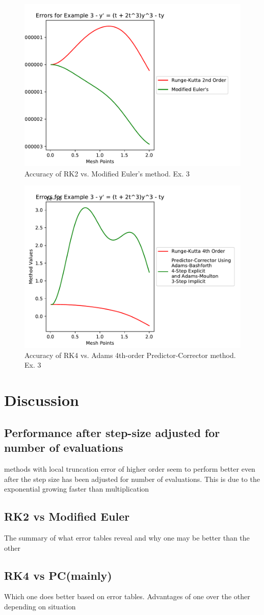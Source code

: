 \documentclass[11pt]{article}	%
\begin{document}
\begin{figure}[H]
\centering
\includegraphics[width=.45\textwidth]{rk2_meuler_3}
\caption{Accuracy of RK2 vs. Modified Euler's method. Ex. 3}
\label{fig:rk2_meuler_3}
\end{figure}

\begin{figure}[H]
\centering
\includegraphics[width=.45\textwidth]{rk4_predictor_3}
\caption{Accuracy of RK4 vs. Adams 4th-order Predictor-Corrector method. Ex. 3}
\label{fig:rk4_predictor_3}
\end{figure}
\clearpage
\section{Discussion}

\subsection{Performance after step-size adjusted for number of evaluations}
methods with local truncation error of higher order seem to perform better even after the step size has been adjusted for number of evaluations. 
This is due to the exponential growing faster than multiplication

\subsection{RK2 vs Modified Euler}
The summary of what error tables reveal and why one may be better than the other

\subsection{RK4 vs PC(mainly)}
Which one does better based on error tables. Advantages of one over
the other depending on situation 
\end{document}
